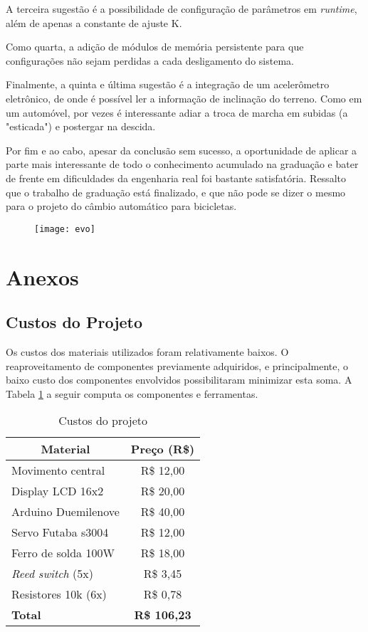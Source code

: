 \documentclass[a4paper,11pt]{article}
\begin{document}
A terceira sugestão é a possibilidade de configuração de parâmetros em
\textit{runtime}, além de apenas a constante de ajuste K.

Como quarta, a adição de módulos de memória persistente para
que configurações não sejam perdidas a cada desligamento do sistema.

Finalmente, a quinta e última sugestão é a integração de um acelerômetro
eletrônico, de onde é possível ler a informação de inclinação do terreno. Como
em um automóvel, por vezes é interessante adiar a troca de marcha em subidas (a
"esticada") e postergar na descida.

Por fim e ao cabo, apesar da conclusão sem sucesso, a oportunidade de aplicar a
parte mais interessante de todo o conhecimento acumulado na graduação e bater
de frente em dificuldades da engenharia real foi bastante satisfatória.
Ressalto que o trabalho de graduação está finalizado, e que não pode se dizer o
mesmo para o projeto do câmbio automático para bicicletas.

\begin{figure}[h!]
\begin{center}
 \texttt{[image: evo]}
\end{center}
\end{figure}


\pagebreak
%
\section{Anexos}
\label{sec:anexos}

%

%
\subsection{Custos do Projeto}
\label{custos}
Os custos dos materiais utilizados foram relativamente baixos. O
reaproveitamento de componentes previamente adquiridos, e principalmente, o
baixo custo dos componentes envolvidos possibilitaram minimizar esta soma. A
Tabela \ref{tab:custos} a seguir computa os componentes e ferramentas.
{
\newcommand{\mc}[3]{\multicolumn{#1}{#2}{#3}}
\begin{table}[ht]
\begin{center}
\caption{Custos do projeto}
\label{tab:custos}
\begin{tabular}{lc}
\mc{1}{c}{\textbf{Material}} & \textbf{Preço (R\$)}\\\hline
Movimento central & R\$ 12,00\\
Display LCD 16x2 & R\$ 20,00\\
Arduino Duemilenove & R\$ 40,00\\
Servo Futaba s3004 & R\$ 12,00\\
Ferro de solda 100W & R\$ 18,00\\
\textit{Reed switch} (5x) & R\$ 3,45\\
Resistores 10k (6x) & R\$ 0,78\\\hline
\textbf{Total} & \textbf{R\$ 106,23}\\\hline
\end{tabular}
\end{center}
\end{table}
}
\end{document}
